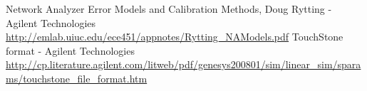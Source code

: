 \begin{thebibliography}{2}

  Network Analyzer Error Models and Calibration Methods, Doug Rytting - Agilent Technologies\\
  \href{http://emlab.uiuc.edu/ece451/appnotes/Rytting_NAModels.pdf}{\url{http://emlab.uiuc.edu/ece451/appnotes/Rytting_NAModels.pdf}}
  TouchStone format - Agilent Technologies\\
  \href{http://cp.literature.agilent.com/litweb/pdf/genesys200801/sim/linear_sim/sparams/touchstone_file_format.htm}{\url{http://cp.literature.agilent.com/litweb/pdf/genesys200801/sim/linear_sim/sparams/touchstone_file_format.htm}}
\end{thebibliography}
\newpage
